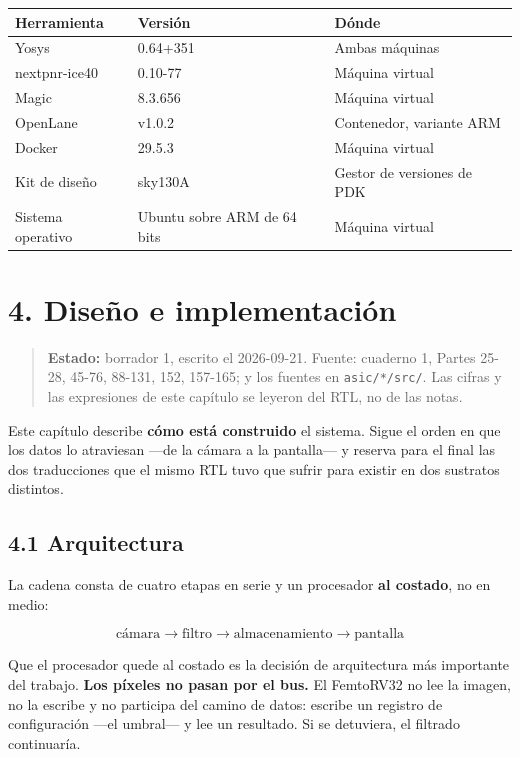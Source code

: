 \begin{longtable}[]{@{}lll@{}}
\toprule\noalign{}
Herramienta & Versión & Dónde \\
\midrule\noalign{}
\endhead
\bottomrule\noalign{}
\endlastfoot
Yosys & 0.64+351 & Ambas máquinas \\
nextpnr-ice40 & 0.10-77 & Máquina virtual \\
Magic & 8.3.656 & Máquina virtual \\
OpenLane & v1.0.2 & Contenedor, variante ARM \\
Docker & 29.5.3 & Máquina virtual \\
Kit de diseño & sky130A & Gestor de versiones de PDK \\
Sistema operativo & Ubuntu sobre ARM de 64 bits & Máquina virtual \\
\end{longtable}

\chapter{4. Diseño e
implementación}\label{diseuxf1o-e-implementaciuxf3n}

\begin{quote}
\textbf{Estado:} borrador 1, escrito el 2026-09-21. Fuente: cuaderno 1,
Partes 25-28, 45-76, 88-131, 152, 157-165; y los fuentes en
\texttt{asic/*/src/}. Las cifras y las expresiones de este capítulo se
leyeron del RTL, no de las notas.
\end{quote}

Este capítulo describe \textbf{cómo está construido} el sistema. Sigue
el orden en que los datos lo atraviesan ---de la cámara a la pantalla---
y reserva para el final las dos traducciones que el mismo RTL tuvo que
sufrir para existir en dos sustratos distintos.

\section{4.1 Arquitectura}\label{arquitectura}

La cadena consta de cuatro etapas en serie y un procesador \textbf{al
costado}, no en medio:

\[\text{cámara} \rightarrow \text{filtro} \rightarrow \text{almacenamiento} \rightarrow \text{pantalla}\]

Que el procesador quede al costado es la decisión de arquitectura más
importante del trabajo. \textbf{Los píxeles no pasan por el bus.} El
FemtoRV32 no lee la imagen, no la escribe y no participa del camino de
datos: escribe un registro de configuración ---el umbral--- y lee un
resultado. Si se detuviera, el filtrado continuaría.

